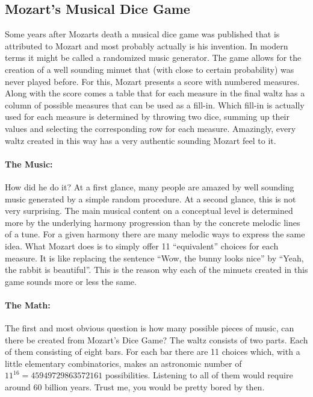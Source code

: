 \subsection{Mozart's Musical Dice Game}
Some years after Mozarts death a musical dice game was published that is attributed to Mozart and most probably actually is his invention. In modern terms it might be called a randomized music generator. The game allows for the creation of a well sounding minuet that (with close to certain probability) was never played before. For this, Mozart presents a score with numbered measures. Along with the score comes a table that for each measure in the final waltz has a column of possible measures that can be used as a fill-in. Which fill-in is actually used for each measure is determined by throwing two dice, summing up their values and selecting the corresponding row for each measure. Amazingly, every waltz created in this way has a very authentic sounding Mozart feel to it.

\paragraph{The Music:} How did he do it? At a first glance, many people are amazed by well sounding music generated by a simple random procedure. At a second glance, this is not very surprising. The main musical content on a conceptual level is determined more by the underlying harmony progression than by the concrete melodic lines of a tune. For a given harmony there are many melodic ways to express the same idea. What Mozart does is to simply offer 11 ``equivalent'' choices for each measure. It is like replacing the sentence ``Wow, the bunny looks nice'' by ``Yeah, the rabbit is beautiful''. This is the reason why each of the minuets created in this game sounds more or less the same.

\paragraph{The Math:} The first and most obvious question is how many possible pieces of music, can there be created from Mozart's Dice Game? The waltz consists of two parts. Each of them consisting of eight bars. For each bar there are 11 choices which, with a little elementary combinatorics, makes an astronomic number of $11^{16} = 45 949 729 863 572 161$ possibilities. Listening to all of them would require around 60 billion years. Trust me, you would be pretty bored by then.

